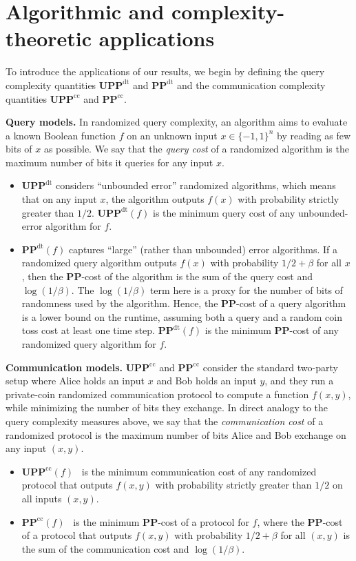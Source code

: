 \documentclass{toc}
\newcommand{\PP}{\mathbf{PP}}
\newcommand{\PPcc}{\mathbf{PP}^{\text{cc}}}
\newcommand{\UPP}{\mathbf{UPP}}
\newcommand{\UPPcc}{\mathbf{UPP}^{\text{cc}}}
\begin{document}
\section{Algorithmic and complexity-theoretic applications} \label{sec:applications}
\label{s2}
To introduce the applications of our results, we begin by defining the query complexity quantities $\UPP^{\text{dt}}$ and $\PP^{\text{dt}}$ and the communication complexity quantities $\UPP^{\text{cc}}$ and $\PP^{\text{cc}}$.

\medskip \noindent \textbf{Query models.} 
In randomized query complexity, an algorithm aims to evaluate a known Boolean function $f$ on an unknown input $x \in \{-1, 1\}^n$ by reading as few bits of $x$ as possible. We say that the \emph{query cost} of a randomized algorithm is the maximum number of bits it queries for any input $x$.

\begin{itemize}
	\item $\UPP^{\text{dt}}$ considers ``unbounded error'' randomized algorithms, which means that on any input $x$, the algorithm outputs $f(x)$ with probability strictly greater than $1/2$. 
	$\UPP^{\text{dt}}(f)$ is the minimum query cost of any 
	unbounded-error %
	algorithm for $f$.
	\item $\PP^{\text{dt}}(f)$ captures ``large'' (rather than unbounded) error algorithms. If
	a randomized query algorithm outputs $f(x)$ with probability $1/2 + \beta$ for all $x$, then the $\PP$-cost
	of the algorithm 
	is the sum of the query cost and $\log(1/\beta)$. The $\log(1/\beta)$ term here is a proxy for the number of bits of randomness used by the algorithm. Hence,
	the $\PP$-cost of a query algorithm is a lower bound on the runtime, assuming both a query and a random coin toss cost at least one time step.
	$\PP^{\text{dt}}(f)$ is the minimum $\PP$-cost of any randomized query algorithm for $f$.
\end{itemize}

\noindent \textbf{Communication models.} 
$\UPPcc$ and $\PPcc$
consider the standard two-party setup
where Alice holds an input $x$ and Bob holds an input $y$, and they run a private-coin randomized communication protocol to compute a function $f(x, y)$, while minimizing the number of bits they  exchange. In direct analogy to the query complexity measures above,
we say that the \emph{communication cost} of a randomized protocol is the maximum number of bits Alice and Bob exchange on any input $(x, y)$.

\begin{itemize}
	\item $\UPP^{\text{cc}}(f)$~\cite{paturisimon} is the minimum communication cost of any randomized protocol that outputs $f(x, y)$ with probability strictly greater than $1/2$ on all inputs $(x, y)$.
	\vspace{-1mm}
	\item $\PP^{\text{cc}}(f)$~\cite{babaietal} is the minimum $\PP$-cost of a protocol for $f$, where the $\PP$-cost of a protocol that outputs $f(x, y)$ with probability $1/2 + \beta$ for all $(x, y)$ is the sum of the communication cost and $\log(1/\beta)$.
\end{itemize}
\end{document}
